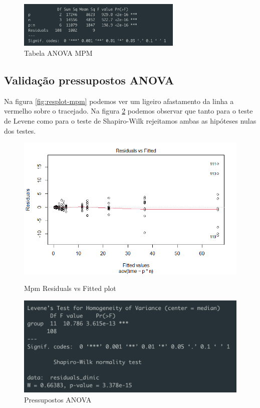 \documentclass{uofa-eng-assignment}
\begin{document}
\begin{figure}[h]
    \centering
    \includegraphics[width=0.7\textwidth]{mpm-anova.png}
    \caption{Tabela ANOVA MPM}
    \label{fig:anova-mpm}
\end{figure}

\subsection{Validação pressupostos ANOVA}

Na figura \ref{fig:resplot-mpm} podemos ver um ligeiro afastamento da linha a vermelho sobre o tracejado. Na figura \ref{fig:pressupostos-mpm} podemos observar que tanto para o teste de Levene como para o teste de Shapiro-Wilk rejeitamos ambas as hipóteses nulas dos testes. 

\begin{figure}[h]
    \begin{minipage}{0.45\textwidth}
        \centering
        \includegraphics[width=1\textwidth]{res_plot_mpm.png}
        \caption{Mpm Residuals vs Fitted plot}
        \label{fig:resplot-mpm}
    \end{minipage}
    \hfill
    \begin{minipage}{0.45\textwidth}
        \centering
        \includegraphics[width=1\textwidth]{pressupostos_mpm.png}
        \caption{Pressupostos ANOVA}
        \label{fig:pressupostos-mpm}
    \end{minipage}
\end{figure}
\end{document}
